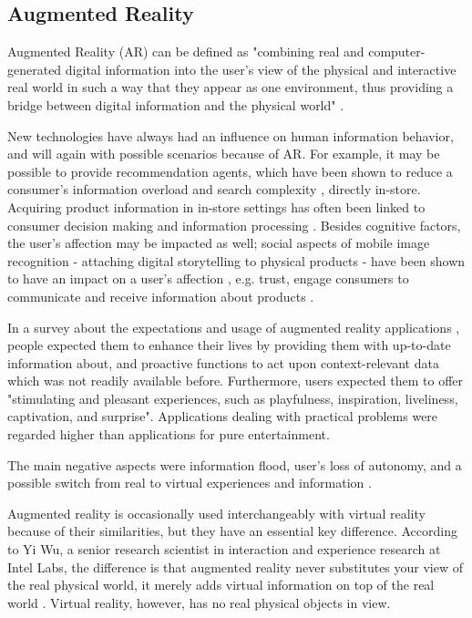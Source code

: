 \documentclass[12pt,journal,compsoc]{IEEEtran}
\begin{document}
\subsection{Augmented Reality}
Augmented Reality (AR) can be defined as "combining real and computer-generated digital information into the user’s view of the physical and interactive real world in such a way that they appear as one environment, thus providing a bridge between digital information and the physical world" \cite{Olsson2011b,Hoellerer2004,Klopfer2007,Vallino1998,Wellner1993}. 

New technologies have always had an influence on human information behavior, and will again with possible scenarios because of AR. For example, it may be possible to provide recommendation agents, which have been shown to reduce a consumer’s information overload and search complexity \cite{Kowatch2010}, directly in-store. Acquiring product information in in-store settings has often been linked to consumer decision making and information processing \cite{Karpischek2010,Kowatch2010,Xiao2007}. Besides cognitive factors, the user’s affection may be impacted as well; social aspects of mobile image recognition - attaching digital storytelling to physical products - have been shown to have an impact on a user’s affection \cite{Barthel2010}, e.g. trust, engage consumers to communicate and receive information about products \cite{Karpischek2010}.

In a survey about the expectations and usage of augmented reality applications \cite{Olsson2011b}, people expected them to enhance their lives by providing them with up-to-date information about, and proactive functions to act upon context-relevant data which was not readily available before. Furthermore, users expected them to offer "stimulating and pleasant experiences, such as playfulness, inspiration, liveliness, captivation, and surprise". Applications dealing with practical problems were regarded higher than applications for pure entertainment.

The main negative aspects were information flood, user's loss of autonomy, and a possible switch from real to virtual experiences and information \cite{Olsson2011b}.

Augmented reality is occasionally used interchangeably with virtual reality because of their similarities, but they have an essential key difference. According to Yi Wu, a senior research scientist in interaction and experience research at Intel Labs, the difference is that augmented reality never substitutes your view of the real physical world, it merely adds virtual information on top of the real world \cite{augmentedVirtualReality}. Virtual reality, however, has no real physical objects in view.
\end{document}
